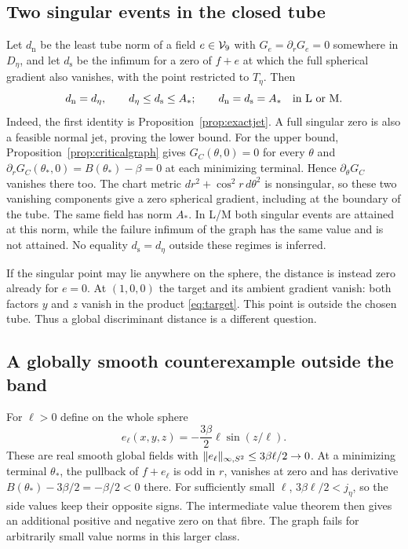 \documentclass[11pt,a4paper]{article}
\begin{document}
\subsection{Two singular events in the closed tube}
Let $d_{\mathrm n}$ be the least tube norm of a field $e\in\mathcal V_9$
with $G_e=\partial_rG_e=0$ somewhere in $D_\eta$, and let
$d_{\mathrm s}$ be the infimum for a zero of $f+e$ at which the
full spherical gradient also vanishes, with the point restricted to
$T_\eta$. Then
\begin{equation}\label{eq:singulardistances}
 d_{\mathrm n}=d_\eta,\qquad
 d_\eta\le d_{\mathrm s}\le A_*;
 \qquad d_{\mathrm n}=d_{\mathrm s}=A_*\quad\hbox{in L or M}.
\end{equation}
Indeed, the first identity is Proposition~\ref{prop:exactjet}.
A full singular zero is also a feasible normal jet, proving the lower
bound. For the upper bound, Proposition~\ref{prop:criticalgraph}
gives $G_C(\theta,0)=0$ for every $\theta$ and
$\partial_rG_C(\theta_*,0)=B(\theta_*)-\beta=0$ at each
minimizing terminal. Hence $\partial_\theta G_C$ vanishes there too.
The chart metric $dr^2+\cos^2r\,d\theta^2$ is nonsingular, so these
two vanishing components give a zero spherical gradient, including
at the boundary of the tube. The same field has norm $A_*$.
In L/M both singular events are attained at this norm, while the
failure infimum of the graph has the same value and is not attained.
No equality $d_{\mathrm s}=d_\eta$ outside these regimes is inferred.

If the singular point may lie anywhere on the sphere, the distance
is instead zero already for $e=0$. At $(1,0,0)$ the target and its
ambient gradient vanish: both factors $y$ and $z$ vanish in the
product \eqref{eq:target}. This point is outside the chosen tube.
Thus a global discriminant distance is a different question.

\subsection{A globally smooth counterexample outside the band}
For $\ell>0$ define on the whole sphere
\begin{equation}\label{eq:outsideband}
 e_\ell(x,y,z)=-\frac{3\beta}{2}\ell\sin(z/\ell).
\end{equation}
These are real smooth global fields with
$\|e_\ell\|_{\infty,S^2}\le3\beta\ell/2\to0$.
At a minimizing terminal $\theta_*$, the pullback of $f+e_\ell$
is odd in $r$, vanishes at zero and has derivative
$B(\theta_*)-3\beta/2=-\beta/2<0$ there.
For sufficiently small $\ell$, $3\beta\ell/2<j_\eta$, so the
side values keep their opposite signs. The intermediate value theorem
then gives an additional positive and negative zero on that fibre.
The graph fails for arbitrarily small value norms in this larger class.
\end{document}

